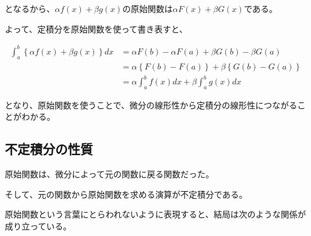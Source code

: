 \documentclass[../../imaging-math]{subfiles}
\begin{document}
となるから、$\alpha f(x) + \beta g(x)$の原始関数は$\alpha F(x) + \beta G(x)$である。

よって、定積分を原始関数を使って書き表すと、

\begin{align}
  \int_{a}^{b} \left\{ \alpha f(x) + \beta g(x) \right\} dx & = \alpha F(b) - \alpha F(a) + \beta G(b) - \beta G(a)                      \\
                                                            & = \alpha \left\{ F(b) - F(a) \right\} + \beta \left\{ G(b) - G(a) \right\} \\
                                                            & = \alpha \int_{a}^{b} f(x) dx + \beta \int_{a}^{b} g(x) dx
\end{align}

となり、原始関数を使うことで、微分の線形性から定積分の線形性につながることがわかる。

\subsection{不定積分の性質}

原始関数は、微分によって元の関数に戻る関数だった。

そして、元の関数から原始関数を求める演算が不定積分である。

\begin{center}
\end{center}

原始関数という言葉にとらわれないように表現すると、結局は次のような関係が成り立っている。

\begin{center}
\end{center}
\end{document}
